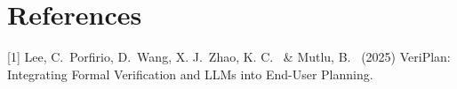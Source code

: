 \documentclass{article}
\begin{document}






\section*{References}




{
\small
% 
[1] Lee, C.\ Porfirio, D.\ Wang, X. J.\ Zhao, K. C. \ \& Mutlu, B. \ (2025) VeriPlan: Integrating Formal Verification and LLMs into End-User Planning. 




}
\end{document}
